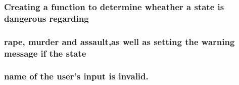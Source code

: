 \documentclass[
]{article}
\newenvironment{Shaded}{\begin{snugshade}}{\end{snugshade}}
\newcommand{\CommentTok}[1]{\textcolor[rgb]{0.56,0.35,0.01}{\textit{#1}}}
\newcommand{\ControlFlowTok}[1]{\textcolor[rgb]{0.13,0.29,0.53}{\textbf{#1}}}
\newcommand{\KeywordTok}[1]{\textcolor[rgb]{0.13,0.29,0.53}{\textbf{#1}}}
\newcommand{\NormalTok}[1]{#1}
\newcommand{\OperatorTok}[1]{\textcolor[rgb]{0.81,0.36,0.00}{\textbf{#1}}}
\newcommand{\StringTok}[1]{\textcolor[rgb]{0.31,0.60,0.02}{#1}}
\begin{document}
\hypertarget{creating-a-function-to-determine-wheather-a-state-is-dangerous-regarding}{%
\subsubsection{Creating a function to determine wheather a state is
dangerous
regarding}\label{creating-a-function-to-determine-wheather-a-state-is-dangerous-regarding}}

\hypertarget{rape-murder-and-assaultas-well-as-setting-the-warning-message-if-the-state}{%
\subsubsection{rape, murder and assault,as well as setting the warning
message if the
state}\label{rape-murder-and-assaultas-well-as-setting-the-warning-message-if-the-state}}

\hypertarget{name-of-the-users-input-is-invalid.}{%
\subsubsection{name of the user's input is
invalid.}\label{name-of-the-users-input-is-invalid.}}

\begin{Shaded}
\end{Shaded}
\end{document}
